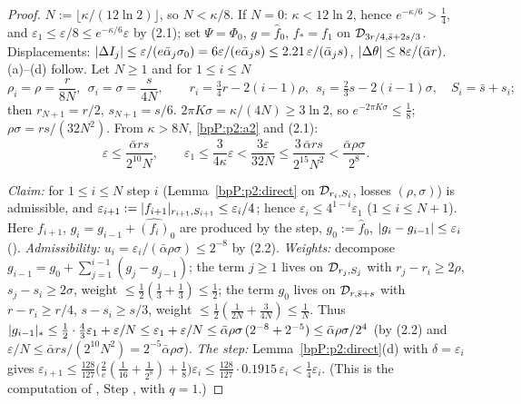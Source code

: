 \begin{proof}
\label{stepP:p2:nfb-N} $N:=\lfloor\kappa/(12\ln2)\rfloor$, so $N<\kappa/8$. If $N=0$: $\kappa<12\ln2$, hence $e^{-\kappa/6}>\frac14$, and $\varepsilon_1\le\varepsilon/8\le e^{-\kappa/6}\varepsilon$ by (2.1); set $\Psi=\Phi_0$, $g=\hat f_0$, $f_*=f_1$ on $\mathcal D_{3r/4,\bar s+2s/3}$. Displacements: $\lvert \Delta I_j\rvert\le\varepsilon/(e\bar\alpha_j\sigma_0)=6\varepsilon/(e\bar\alpha_js)\le2.21\,\varepsilon/(\bar\alpha_j s)$, $\lvert \Delta\theta\rvert\le8\varepsilon/(\bar\alpha r)$. (a)--(d) follow.
Let $N\ge1$ and for $1\le i\le N$
\[\rho_i=\rho=\frac r{8N},\ \ \sigma_i=\sigma=\frac s{4N},\qquad r_i=\tfrac34r-2(i-1)\rho,\ \ s_i=\tfrac23s-2(i-1)\sigma,\quad S_i=\bar s+s_i;\]
then $r_{N+1}=r/2$, $s_{N+1}=s/6$. $2\pi K\sigma=\kappa/(4N)\ge3\ln 2$, so $e^{-2\pi K\sigma}\le\frac18$; $\rho\sigma=rs/(32N^2)$. From $\kappa>8N$, \ref{bpP:p2:a2} and (2.1):
\[\varepsilon\le\frac{\bar\alpha rs}{2^{10}N},\qquad \varepsilon_1\le\frac{3}{4\kappa}\varepsilon<\frac{3\varepsilon}{32N}\le\frac{3\,\bar\alpha rs}{2^{15}N^2}<\frac{\bar\alpha\rho\sigma}{2^8}.\tag{2.2}\]

\label{stepP:p2:nfb-ind} \emph{Claim:} for $1\le i\le N$ step $i$ (Lemma~\ref{bpP:p2:direct} on $\mathcal D_{r_i,S_i}$, losses $(\rho,\sigma)$) is admissible, and $\varepsilon_{i+1}:=\lvert f_{i+1}\rvert_{r_{i+1},S_{i+1}}\le\varepsilon_i/4$; hence $\varepsilon_i\le4^{1-i}\varepsilon_1$ ($1\le i\le N+1$).
Here $f_{i+1}$, $g_i=g_{i-1}+\hat{(f_i)}_0$ are produced by the step, $g_0:=\hat f_0$, $\lvert g_i-g_{i-1}\rvert\le\varepsilon_i$ ().
\emph{Admissibility:} $u_i=\varepsilon_i/(\bar\alpha\rho\sigma)\le2^{-8}$ by (2.2). \emph{Weights:} decompose $g_{i-1}=g_0+\sum_{j=1}^{i-1}(g_j-g_{j-1})$; the term $j\ge1$ lives on $\mathcal D_{r_j,S_j}$ with $r_j-r_i\ge2\rho$, $s_j-s_i\ge2\sigma$, weight $\le\frac12(\frac13+\frac13)\le\frac12$; the term $g_0$ lives on $\mathcal D_{r,\bar s+s}$ with $r-r_i\ge r/4$, $s-s_i\ge s/3$, weight $\le\frac12(\frac{1}{2N}+\frac3{4N})\le\frac1N$. Thus
$\lvert g_{i-1}\rvert_*\le\frac12\cdot\frac43\varepsilon_1+\varepsilon/N\le\varepsilon_1+\varepsilon/N\le\bar\alpha\rho\sigma\,(2^{-8}+2^{-5})\le\bar\alpha\rho\sigma/2^4$ (by (2.2) and $\varepsilon/N\le\bar\alpha rs/(2^{10}N^2)=2^{-5}\bar\alpha\rho\sigma$). \emph{The step:} Lemma~\ref{bpP:p2:direct}(d) with $\delta=\varepsilon_i$ gives
$\varepsilon_{i+1}\le\tfrac{128}{127}\bigl(\tfrac2e(\tfrac1{16}+\tfrac1{2^8})+\tfrac18\bigr)\varepsilon_i\le\tfrac{128}{127}\cdot0.1915\,\varepsilon_i<\tfrac14\varepsilon_i$. (This is the computation of , Step , with $q=1$.)


\end{proof}
